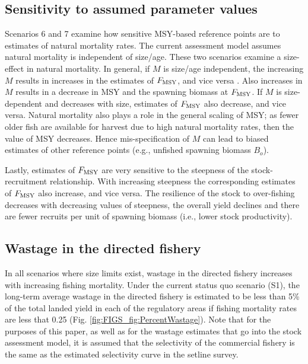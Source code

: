 \subsection*{Sensitivity to assumed parameter values} %
\label{sub:sensitivity_to_assumed_parameter_values}
Scenarios 6 and 7 examine how sensitive MSY-based reference points are to estimates of natural mortality rates.  The current assessment model assumes natural mortality is independent of size/age.  These two scenarios examine a size-effect in natural mortality.  In general, if $M$ is size/age independent, the increasing $M$ results in increases in the estimates of $F_{\rm{MSY}}$, and vice versa \citep{WalMart2004}.  Also increases in $M$ results in a decrease in MSY and the spawning biomass at $F_{\rm{MSY}}$.  If $M$ is size-dependent and decreases with size, estimates of $F_{\rm{MSY}}$  also decrease, and vice versa.  Natural mortality also plays a role in the general scaling of MSY; as fewer older fish are available for harvest due to high natural mortality rates, then the value of MSY decreases.  Hence mis-specification of $M$ can lead to biased estimates of other reference points (e.g., unfished spawning biomass $B_o$).

Lastly, estimates of $F_{\rm{MSY}}$ are very sensitive to the steepness of the stock-recruitment relationship.  With increasing steepness the corresponding estimates of $F_{\rm{MSY}}$ also increase, and vice versa.  The resilience of the stock to over-fishing decreases with decreasing values of steepness,  the overall yield declines and there are fewer recruits per unit of spawning biomass (i.e., lower stock productivity).


\subsection*{Wastage in the directed fishery} %
\label{sub:wastage_in_the_directed_fishery}

In all scenarios where size limits exist, wastage in the directed fishery increases with increasing fishing mortality.  Under the current status quo scenario (S1), the long-term average wastage in the directed fishery is estimated to be less than 5\% of the total landed yield in each of the regulatory areas if fishing mortality rates are  less that 0.25 (Fig. \ref{fig:FIGS_fig:PercentWastage}). Note that for the purposes of this paper, as well as for the wastage estimates that go into the stock assessment model, it is assumed that the selectivity of the commercial fishery is the same as the estimated selectivity curve in the setline survey.

